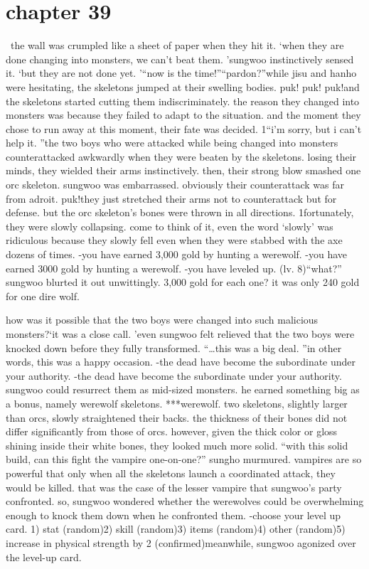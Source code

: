 \section{chapter 39}






 the wall was crumpled like a sheet of paper when they hit it.
‘when they are done changing into monsters, we can’t beat them.
’sungwoo instinctively sensed it.
 ‘but they are not done yet.
’“now is the time!”“pardon?”while jisu and hanho were hesitating, the skeletons jumped at their swelling bodies.
puk! puk! puk!and the skeletons started cutting them indiscriminately.
the reason they changed into monsters was because they failed to adapt to the situation.
 and the moment they chose to run away at this moment, their fate was decided.
1“i’m sorry, but i can’t help it.
”the two boys who were attacked while being changed into monsters counterattacked awkwardly when they were beaten by the skeletons.
 losing their minds, they wielded their arms instinctively.
then, their strong blow smashed one orc skeleton.
sungwoo was embarrassed.
 obviously their counterattack was far from adroit.
puk!they just stretched their arms not to counterattack but for defense.
 but the orc skeleton’s bones were thrown in all directions.
1fortunately, they were slowly collapsing.
 come to think of it, even the word ‘slowly’ was ridiculous because they slowly fell even when they were stabbed with the axe dozens of times.
-you have earned 3,000 gold by hunting a werewolf.
-you have earned 3000 gold by hunting a werewolf.
-you have leveled up.
 (lv.
 8)“what?” sungwoo blurted it out unwittingly.
 3,000 gold for each one? it was only 240 gold for one dire wolf.

how was it possible that the two boys were changed into such malicious monsters?‘it was a close call.
’even sungwoo felt relieved that the two boys were knocked down before they fully transformed.
“…this was a big deal.
”in other words, this was a happy occasion.
-the dead have become the subordinate under your authority.
-the dead have become the subordinate under your authority.
sungwoo could resurrect them as mid-sized monsters.
 he earned something big as a bonus, namely werewolf skeletons.
***werewolf.
 two skeletons, slightly larger than orcs, slowly straightened their backs.
 the thickness of their bones did not differ significantly from those of orcs.
 however, given the thick color or gloss shining inside their white bones, they looked much more solid.
“with this solid build, can this fight the vampire one-on-one?” sungho murmured.
vampires are so powerful that only when all the skeletons launch a coordinated attack, they would be killed.
that was the case of the lesser vampire that sungwoo’s party confronted.
so, sungwoo wondered whether the werewolves could be overwhelming enough to knock them down when he confronted them.
-choose your level up card.
1) stat (random)2) skill (random)3) items (random)4) other (random)5) increase in physical strength by 2 (confirmed)meanwhile, sungwoo agonized over the level-up card.


